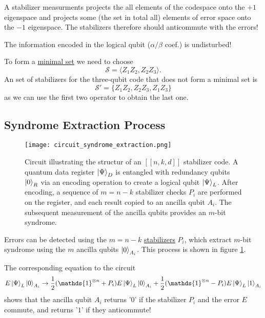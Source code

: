 A stabilizer measurments projects the all elements of the codespace onto the $+1$ eigenspace 
and projects some (the set in total all) elements of error space onto the $-1$ eigenspace. 
The stabilizers therefore should anticommute with the errors!

The information encoded in the logical qubit ($\alpha/\beta$ coef.) is undisturbed!

To form a \hyperref[sec:basic.math.minimal_set]{minimal set} we need to choose
\begin{equation}
    \mathcal{S} = \langle Z_1 Z_2, Z_2 Z_3 \rangle.
\end{equation}
An set of stabilizers for the three-qubit code that does not form a minimal set is
\begin{equation}
    \mathcal{S}' = \{ Z_1 Z_2, Z_2 Z_3, Z_1 Z_3\}
\end{equation}
as we can use the first two operator to obtain the last one.

\subsection{Syndrome Extraction Process}\label{sec:basic.qc.syndrome_extraction_process}

\begin{figure}[h]
    \begin{center}
        \texttt{[image: circuit\_syndrome\_extraction.png]}
    \end{center}
    \caption{
        Circuit illustrating the structur of an $[[n,k,d]]$ stabilizer code. 
        A quantum data register $\ket{\Psi}_D$ is entangled with redundancy qubits $\ket{0}_R$ via an encoding operation to create a logical qubit $\ket{\Psi}_L$.
        After encoding, a sequence of $m = n - k$ stabilizer checks $P_i$ are performed on the register, and each result copied to an ancilla qubit $A_i$.         
        The subsequent measurement of the ancilla qubits provides an $m$-bit syndrome.
    }

    \label{fig:basic.qc.syndrome_extraction.circuit}
\end{figure}

Errors can be detected using the $m=n-k$ \hyperref[sec:basic.qc.stabilizer]{stabilizers} $P_i$, which extract $m$-bit syndrome using the $m$ ancilla qubits $\ket{0}_{A_i}$.
This process is shown in figure \ref{fig:basic.qc.syndrome_extraction.circuit}.

The corresponding equation to the circuit
\begin{equation}
    E \ket{\Psi}_L \ket{0}_{A_i} \rightarrow \frac{1}{2} (\mathds{1}^{\otimes n} + P_i) E \ket{\Psi}_L \ket{0}_{A_i} +  \frac{1}{2} (\mathds{1}^{\otimes n} - P_i) E   \ket{\Psi}_L \ket{1}_{A_i} 
\end{equation}
shows that the ancilla qubit $A_i$ returns '$0$' if the stabilizer $P_i$ and the error $E$ commute,
and returns '$1$' if they anticommute! 

